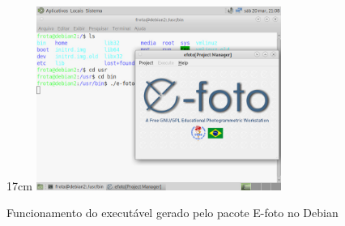 \begin{figure}[!ht]{17cm}
	\centering
	\includegraphics[width=8cm]{Figuras/debian_exec.jpg}
	\caption{Funcionamento do executável gerado pelo pacote E-foto no Debian} \label{fig:debian_exec}
\end{figure}

